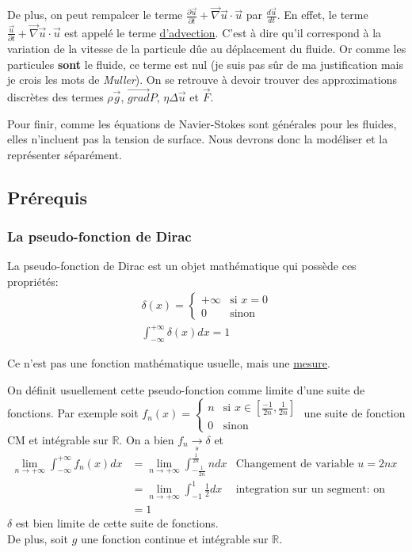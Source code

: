 \documentclass[a4paper,10pt]{report}
\begin{document}
De plus, on peut rempalcer le terme $\frac{\partial \vec{u}}{\partial t} + \vec{\nabla}\vec{u}\cdot \vec{u}$ par $\frac{d \vec{u}}{dt}$. En effet, le terme $\frac{\vec{u}}{\partial t} + \vec{\nabla}\vec{u}\cdot \vec{u}$ est appelé le terme \href{https://fr.wikipedia.org/wiki/Advection}{d'advection}. C'est à dire qu'il correspond à la variation de la vitesse de la particule dûe au déplacement du fluide. Or comme les particules \textbf{sont} le fluide, ce terme est nul (je suis pas sûr de ma justification mais je crois les mots de \textit{Muller}). On se retrouve à devoir trouver des approximations discrètes des termes $\rho \vec{g}$, $\vec{grad} P$, $\eta \Delta \vec{u}$ et $\vec{F}$.

Pour finir, comme les équations de Navier-Stokes sont générales pour les fluides, elles n'incluent pas la tension de surface. Nous devrons donc la modéliser et la représenter séparément.
\subsection{Prérequis}
\subsubsection{La pseudo-fonction de Dirac}
La pseudo-fonction de Dirac est un objet mathématique qui possède ces propriétés:
\begin{align*}
 \delta(x) =
\begin{cases}
  + \infty & \text{si } x=0 \\
  0 & \text{sinon}
 \end{cases} \\
 \int_{-\infty}^{+\infty} \delta(x)dx = 1
\end{align*}

Ce n'est pas une fonction mathématique usuelle, mais une \href{https://fr.wikipedia.org/wiki/Théorie_de_la_mesure}{mesure}.

On définit usuellement cette pseudo-fonction comme limite d'une suite de fonctions. Par exemple soit
$
f_n(x) =
\begin{cases}
 n & \text{si } x\in [\frac{-1}{2n}, \frac{1}{2n}] \\
 0 & \text{sinon}
\end{cases}
$
une suite de fonction CM et intégrable sur $\mathbb{R}$. On a bien $f_n \underset{s}{\to} \delta$ et
\begin{align*}
 \lim_{n\to +\infty} \int_{-\infty}^{+ \infty} f_n(x)dx &=\lim_{n\to +\infty} \int_{-\frac{1}{2n}}^{\frac{1}{2n}} ndx & \text{Changement de variable } u=2nx\\
 &= \lim_{n\to +\infty} \int_{-1}^{1} \frac{1}{2}dx & \text{integration sur un segment: on peut rentrer la limite dans l'intégrale}\\
 &= 1 &
\end{align*}
$\delta$ est bien limite de cette suite de fonctions.
\\
De plus, soit $g$ une fonction continue et intégrable sur $\mathbb{R}$.
\end{document}
